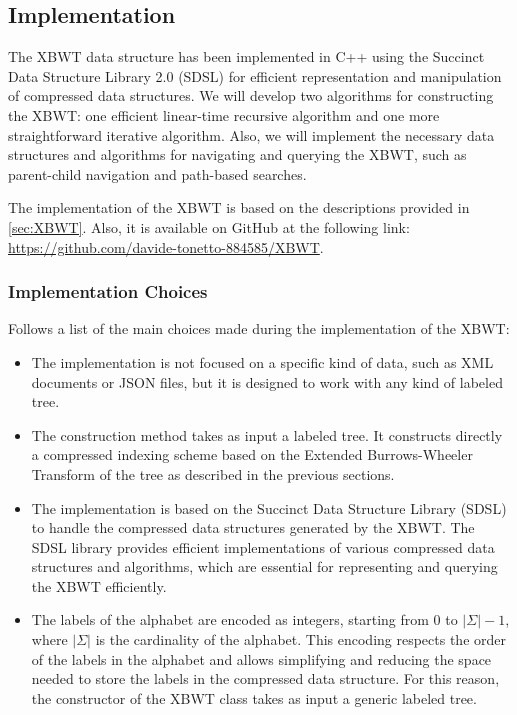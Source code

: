 \subsection{Implementation} \label{sec:xbwt_impl}



The XBWT data structure has been implemented in C++ using the Succinct Data Structure Library 2.0 (SDSL) for efficient representation and manipulation of compressed data structures. We will develop two algorithms for constructing the XBWT: one efficient linear-time recursive algorithm and one more straightforward iterative algorithm. Also, we will implement the necessary data structures and algorithms for navigating and querying the XBWT, such as parent-child navigation and path-based searches. 

The implementation of the XBWT is based on the descriptions provided in \cref{sec:XBWT}. Also, it is available on GitHub at the following link: \url{https://github.com/davide-tonetto-884585/XBWT}.

\subsubsection{Implementation Choices}
Follows a list of the main choices made during the implementation of the XBWT:
\begin{itemize}
    \item The implementation is not focused on a specific kind of data, such as XML documents or JSON files, but it is designed to work with any kind of labeled tree. 
    \item The construction method takes as input a labeled tree. It constructs directly a compressed indexing scheme based on the Extended Burrows-Wheeler Transform of the tree as described in the previous sections.
    \item The implementation is based on the Succinct Data Structure Library (SDSL) to handle the compressed data structures generated by the XBWT. The SDSL library provides efficient implementations of various compressed data structures and algorithms, which are essential for representing and querying the XBWT efficiently.
    \item The labels of the alphabet are encoded as integers, starting from 0 to $|\Sigma| - 1$, where $|\Sigma|$ is the cardinality of the alphabet. This encoding respects the order of the labels in the alphabet and allows simplifying and reducing the space needed to store the labels in the compressed data structure. For this reason, the constructor of the XBWT class takes as input a generic labeled tree.
\end{itemize}

